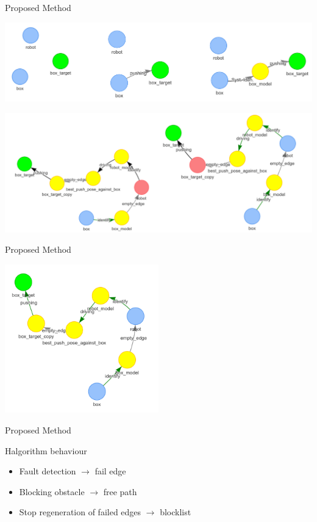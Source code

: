 
\begin{frame}[fragile]{Proposed Method} 
\begin{center}
  \includegraphics[width=1.0\textwidth]{figures/proposed_method/hgraph_example1}\pause

  \includegraphics[width=1.0\textwidth]{figures/proposed_method/hgraph_example2}
\end{center}
\end{frame}

\begin{frame}[fragile]{Proposed Method} 
  \begin{center}
    \includegraphics[width=0.5\textwidth]{figures/proposed_method/hgraph_example3}
  \end{center}
\end{frame}

\begin{frame}[fragile]{Proposed Method} 
\begin{block}{Halgorithm behaviour}
    \begin{itemize}
      \item Fault detection $\rightarrow$ fail edge
      \item Blocking obstacle $\rightarrow$ free path 
      \item Stop regeneration of failed edges $\rightarrow$ blocklist
    \end{itemize}
  \end{block}
\end{frame}
